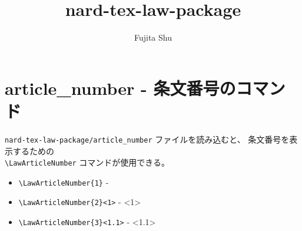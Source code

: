 \documentclass[oneside,10pt,a4paper]{jsarticle}
\title{nard-tex-law-package}
\author{Fujita Shu}
\begin{document}
  \maketitle

  \section{article\_number - 条文番号のコマンド}

  \verb|nard-tex-law-package/article_number| ファイルを読み込むと、
  条文番号を表示するための\\
  \verb|\LawArticleNumber| コマンドが使用できる。

  \begin{itemize}
    \item \verb|\LawArticleNumber{1}| - 
    \item \verb|\LawArticleNumber{2}<1>| - <1>
    \item \verb|\LawArticleNumber{3}<1.1>| - <1.1>
  \end{itemize}
\end{document}
